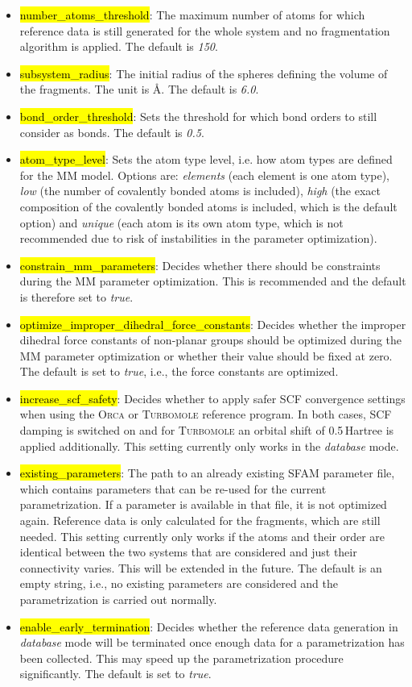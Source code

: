 \documentclass[]{tufte-book}
\begin{document}
{{\begin{itemize}
\item \hl{number\_atoms\_threshold}: The maximum number of atoms for which reference data is still generated for the whole system and no fragmentation algorithm is applied. The default is \textit{150}.
\item \hl{subsystem\_radius}: The initial radius of the spheres defining the volume of the fragments. The unit is \AA. The default is \textit{6.0}.
\item \hl{bond\_order\_threshold}: Sets the threshold for which bond orders to still consider as bonds. The default is \textit{0.5}.
\item \hl{atom\_type\_level}: Sets the atom type level, i.e. how atom types are defined for the MM model. Options are: \textit{elements} (each element is one atom type), \textit{low} (the number of covalently bonded atoms is included), \textit{high} (the exact composition of the covalently bonded atoms is included, which is the default option) and \textit{unique} (each atom is its own atom type, which is not recommended due to risk of instabilities in the parameter optimization).
\item \hl{constrain\_mm\_parameters}: Decides whether there should be constraints during the MM parameter optimization. This is recommended and the default is therefore set to \textit{true}.
\item \hl{optimize\_improper\_dihedral\_force\_constants}: Decides whether the improper dihedral force constants of non-planar groups should be optimized during the MM parameter optimization or whether their value should be fixed at zero. The default is set to \textit{true}, i.e., the force constants are optimized.
\item \hl{increase\_scf\_safety}: Decides whether to apply safer SCF convergence settings when using the \textsc{Orca} or \textsc{Turbomole} reference program. In both cases, SCF damping is switched on and for \textsc{Turbomole} an orbital shift of 0.5\,Hartree is applied additionally. This setting currently only works in the \textit{database} mode.
\item \hl{existing\_parameters}: The path to an already existing SFAM parameter file, which contains parameters that can be re-used for the current parametrization. If a parameter is available in that file, it is not optimized again. Reference data is only calculated for the fragments, which are still needed. This setting currently only works if the atoms and their order are identical between the two systems that are considered and just their connectivity varies. This will be extended in the future. The default is an empty string, i.e., no existing parameters are considered and the parametrization is carried out normally.
\item \hl{enable\_early\_termination}: Decides whether the reference data generation in \textit{database} mode will be terminated once enough data for a parametrization has been collected. This may speed up the parametrization procedure significantly. The default is set to \textit{true}.
\end{itemize}

}}
\end{document}
